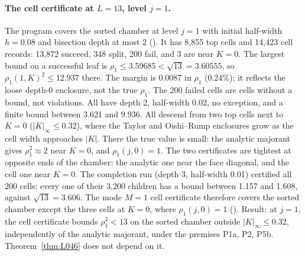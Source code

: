 \paragraph{The cell certificate at $L=13$, level $j=1$.} The program  covers the sorted chamber at level $j=1$ with initial half-width $h=0.08$ and bisection depth at most 2 (). It has 8{,}855 top cells and 14{,}423 cell records: 13{,}872 succeed, 348 split, 200 fail, and 3 are near $K=0$. The largest bound on a successful leaf is $\rho_1\le3.59685<\sqrt{13}=3.60555$, so $\rho_1(1,K)^2\le12.937$ there. The margin is 0.0087 in $\rho_1$ (0.24\%); it reflects the loose depth-0 enclosure, not the true $\rho_1$.
The 200 failed cells are cells without a bound, not violations. All have depth 2, half-width 0.02, no exception, and a finite bound between 3.621 and 9.936. All descend from two top cells next to $K=0$ ($|K|_\infty\le0.32$), where the Taylor and Oishi--Rump enclosures grow as the cell width approaches $|K|$. There the true value is small: the analytic majorant gives $\rho_1^2\approx2$ near $K=0$, and $\rho_1(j,0)=1$. The two certificates are tightest at opposite ends of the chamber: the analytic one near the face diagonal, and the cell one near $K=0$. The completion run (depth 3, half-width 0.01) certified all 200 cells: every one of their 3{,}200 children has a bound between 1.157 and 1.608, against $\sqrt{13}=3.606$. The mode $M=1$ cell certificate therefore covers the sorted chamber except the three cells at $K=0$, where $\rho_1(j,0)=1$ ().
Result: at $j=1$, the cell certificate bounds $\rho_1^2<13$ on the sorted chamber outside $|K|_\infty\le0.32$, independently of the analytic majorant, under the premises P1a, P2, P5b. Theorem~\ref{thm:L046} does not depend on it.

